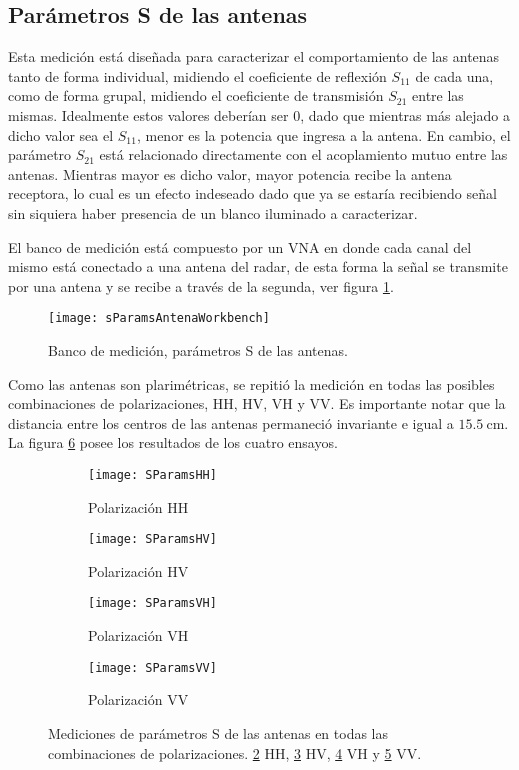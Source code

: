 \subsection{Parámetros S de las antenas} \label{ssc:sParameters}

Esta medición está diseñada para caracterizar el comportamiento de las antenas tanto de forma individual, midiendo el coeficiente de reflexión $S_{11}$ de cada una, como de forma grupal, midiendo el coeficiente de transmisión $S_{21}$ entre las mismas. Idealmente estos valores deberían ser 0, dado que mientras más alejado a dicho valor sea el $S_{11}$, menor es la potencia que ingresa a la antena. En cambio, el parámetro $S_{21}$ está relacionado directamente con el acoplamiento mutuo entre las antenas. Mientras mayor es dicho valor, mayor potencia recibe la antena receptora, lo cual es un efecto indeseado dado que ya se estaría recibiendo señal sin siquiera haber presencia de un blanco iluminado a caracterizar.

El banco de medición está compuesto por un VNA en donde cada canal del mismo está conectado a una antena del radar, de esta forma  la señal se transmite por una antena y se recibe a través de la segunda, ver figura \ref{fig:sParamsConnections}.
\begin{figure}[H]
 \centering
 \texttt{[image: sParamsAntenaWorkbench]}
 \caption{Banco de medición, parámetros S de las antenas.}
 \label{fig:sParamsConnections}
\end{figure}

Como las antenas son plarimétricas, se repitió la medición en todas las posibles combinaciones de polarizaciones, HH, HV, VH y VV. Es importante notar que la distancia entre los centros de las antenas permaneció invariante e igual a $\SI{15.5}{\centi\meter}$. La figura \ref{fig:sParametersMeasurements} posee los resultados de los cuatro ensayos.

\begin{figure}[H]
  \centering
  \begin{subfigure}{0.47\textwidth}
    \centering
    \texttt{[image: SParamsHH]}
    \caption{Polarización HH}
    \label{subfig:hhPol}
  \end{subfigure}
  \begin{subfigure}{0.47\textwidth}
    \centering
    \texttt{[image: SParamsHV]}
    \caption{Polarización HV}
    \label{subfig:hvPol}
  \end{subfigure}

  \begin{subfigure}{0.47\textwidth}
    \centering
    \texttt{[image: SParamsVH]}
    \caption{Polarización VH}
    \label{subfig:vhPol}
  \end{subfigure}
  \begin{subfigure}{0.47\textwidth}
    \centering
    \texttt{[image: SParamsVV]}
    \caption{Polarización VV}
    \label{subfig:vvPol}
  \end{subfigure}
  \caption{Mediciones de parámetros S de las antenas en todas las combinaciones de polarizaciones. \ref{subfig:hhPol} HH, \ref{subfig:hvPol} HV, \ref{subfig:vhPol} VH y \ref{subfig:vvPol} VV.}
  \label{fig:sParametersMeasurements}
\end{figure}

